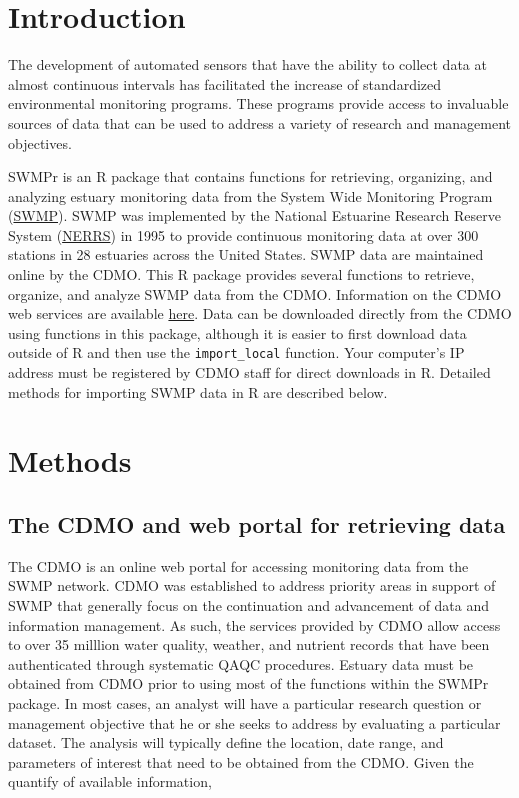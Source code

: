 \documentclass[10pt,letterpaper]{article}\usepackage[]{graphicx}\usepackage[]{color}
\begin{document}
\linenumbers

\section*{Introduction}

The development of automated sensors that have the ability to collect data at almost continuous intervals has facilitated the increase of standardized environmental monitoring programs.  These programs provide access to invaluable sources of data that can be used to address a variety of research and management objectives.  

SWMPr is an R package that contains functions for retrieving, organizing, and analyzing estuary monitoring data from the System Wide Monitoring Program (\href{http://nerrs.noaa.gov/RCDefault.aspx?ID=18}{SWMP}).  SWMP was implemented by the National Estuarine Research Reserve System (\href{http://nerrs.noaa.gov/}{NERRS}) in 1995 to provide continuous monitoring data at over 300 stations in 28 estuaries across the United States.  SWMP data are maintained online by the \ac{CDMO}. This R package provides several functions to retrieve, organize, and analyze SWMP data from the \ac{CDMO}.  Information on the \ac{CDMO} web services are available \href{http://cdmo.baruch.sc.edu/webservices.cfm}{here}.  Data can be downloaded directly from the \ac{CDMO} using functions in this package, although it is easier to first download data outside of R and then use the \texttt{import\_local} function.  Your computer's IP address must be registered by \ac{CDMO} staff for direct downloads in R.  Detailed methods for importing SWMP data in R are described below.  

\section*{Methods}

\subsection*{The \ac{CDMO} and web portal for retrieving data}

The \acl{CDMO} is an online web portal for accessing monitoring data from the \ac{SWMP} network.  \ac{CDMO} was established to address priority areas in support of \ac{SWMP} that generally focus on the continuation and advancement of data and information management.  As such, the services provided by \ac{CDMO} allow access to over 35 milllion water quality, weather, and nutrient records that have been authenticated through systematic \ac{QAQC} procedures.  Estuary data must be obtained from \ac{CDMO} prior to using most of the functions within the SWMPr package.  In most cases, an analyst will have a particular research question or management objective that he or she seeks to address by evaluating a particular dataset.  The analysis will typically define the location, date range, and parameters of interest that need to be obtained from the \ac{CDMO}.  Given the quantify of available information, 
\end{document}

